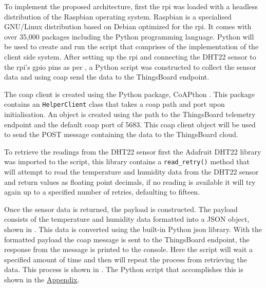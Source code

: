 To implement the proposed architecture, first the \gls{rpi} was loaded with a 
headless distribution of the Raspbian \citep{raspbian_raspbian_2018} operating system. 
Raspbian is a specialised GNU/Linux distribution based on Debian optimized for 
the \gls{rpi}. 
It comes with over 35,000 packages including the Python programming language. 
Python will be used to create and run the script that comprises of the implementation
of the client side system.
After setting up the \gls{rpi} and connecting the DHT22 sensor to the \gls{rpi}'s
\gls{gpio} pins as per , a Python script was constructed
to collect the sensor data and using \gls{coap} send the data to the ThingsBoard
\citep{thingsboard_inc._thingsboard_2018} endpoint. 

The \gls{coap} client is created using the Python package, CoAPthon
\citep{tanganelli_coapthon3_2018}. 
This package contains an \texttt{HelperClient} class that takes a \gls{coap} 
path and port upon initialisation. 
An object is created using the path to the 
ThingsBoard telemetry endpoint and the default \gls{coap} port of 5683.
This \gls{coap} client object will be used to send the POST message containing
the data to the ThingsBoard cloud.

To retrieve the readings from the DHT22 sensor
first the Adafruit DHT22 library \citep{adafruit_adafruit_python_dht_2018} 
was imported to the script, this library contains a \texttt{read\_retry()} 
method that will attempt to read the temperature and humidity data from the 
DHT22 sensor and return values as floating point decimals, 
if no reading is available it will try again up to a specified number of retries,
defaulting to fifteen.


Once the sensor data is returned, the payload is constructed. The payload 
consists of the temperature and humidity data formatted into a JSON object, 
shown in . This data is converted using the built-in
Python \gls{json} library. 
With the formatted payload the \gls{coap} message is sent to the ThingsBoard
endpoint, the response from the message is printed to the console.
Here the script will wait a specified amount of time and then will repeat the 
process from retrieving the data. This process is shown in 
. The Python script that accomplishes this is 
shown in the \hyperref[app:A]{Appendix}.

